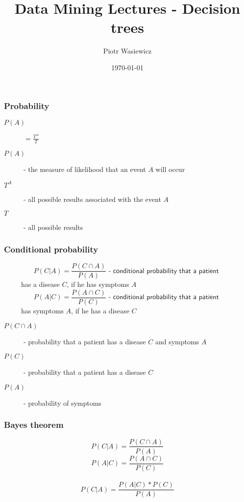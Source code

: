 \documentclass[proffesionalfonts]{beamer}
\title[EARIN]{Data Mining Lectures - Decision trees}
\author{Piotr Wasiewicz}
\institute[ICS PW]
{
Institute of Computer Science\\
\medskip
{\emph{pwasiewi@elka.pw.edu.pl}}
}
\date{\today}
\newcommand{\faup}{ }
\begin{document}
\begin{frame}
\frametitle{Probability}
\begin{center}
\large
\begin{description}
\item[$P(A)$]$= \frac{T^A}{T}$
\item[$P(A)$] - the measure of likelihood that an event $A$ will occur
\item[$T^A$] - all possible results associated with the event $A$
\item[$T$] - all possible results 
\end{description}
\normalsize
\end{center}
\end{frame}

\begin{frame}\frametitle{Conditional probability}
\large
\[P(C|A)=\frac{P(C\cap A)}{P(A)}\textsf{\faup\ \ - conditional probability that a patient }\] 
\ \ \ \ \ has a disease $C$, if he has symptoms $A$
\[P(A|C)=\frac{P(A\cap C)}{P(C)}\textsf{\faup\ \  - conditional probability that a patient }\]
\ \ \ \ \ has symptoms $A$, if he has a disease $C$
\begin{description}
\item[$P(C\cap A)$] - probability that a patient has a disease $C$ and symptoms $A$
\item[$P(C)$] - probability that a patient has a disease $C$
\item[$P(A)$] - probability of symptoms
\end{description}
\normalsize
\end{frame}

\begin{frame}\frametitle{Bayes theorem}
\begin{center}
\large
\[P(C|A)=\frac{P(C\cap A)}{P(A)}\]  
\[P(A|C)=\frac{P(A\cap C)}{P(C)}\]\\
\Large
\[P(C|A)=\frac{P(A|C)*P(C)}{P(A)}\]
\normalsize
\end{center}
\end{frame}
\end{document}
